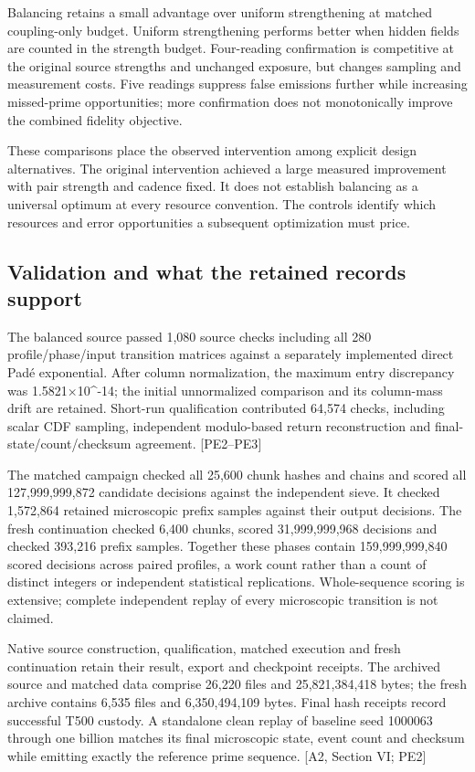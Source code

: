 Balancing retains a small advantage over uniform strengthening at matched coupling-only budget. Uniform strengthening performs better when hidden fields are counted in the strength budget. Four-reading confirmation is competitive at the original source strengths and unchanged exposure, but changes sampling and measurement costs. Five readings suppress false emissions further while increasing missed-prime opportunities; more confirmation does not monotonically improve the combined fidelity objective.

These comparisons place the observed intervention among explicit design alternatives. The original intervention achieved a large measured improvement with pair strength and cadence fixed. It does not establish balancing as a universal optimum at every resource convention. The controls identify which resources and error opportunities a subsequent optimization must price.

\subsection{Validation and what the retained records support}\label{validation-and-what-the-retained-records-support}

The balanced source passed 1,080 source checks including all 280 profile/phase/input transition matrices against a separately implemented direct Padé exponential. After column normalization, the maximum entry discrepancy was 1.5821×10\^{}-14; the initial unnormalized comparison and its column-mass drift are retained. Short-run qualification contributed 64,574 checks, including scalar CDF sampling, independent modulo-based return reconstruction and final-state/count/checksum agreement. {[}PE2--PE3{]}

The matched campaign checked all 25,600 chunk hashes and chains and scored all 127,999,999,872 candidate decisions against the independent sieve. It checked 1,572,864 retained microscopic prefix samples against their output decisions. The fresh continuation checked 6,400 chunks, scored 31,999,999,968 decisions and checked 393,216 prefix samples. Together these phases contain 159,999,999,840 scored decisions across paired profiles, a work count rather than a count of distinct integers or independent statistical replications. Whole-sequence scoring is extensive; complete independent replay of every microscopic transition is not claimed.

Native source construction, qualification, matched execution and fresh continuation retain their result, export and checkpoint receipts. The archived source and matched data comprise 26,220 files and 25,821,384,418 bytes; the fresh archive contains 6,535 files and 6,350,494,109 bytes. Final hash receipts record successful T500 custody. A standalone clean replay of baseline seed 1000063 through one billion matches its final microscopic state, event count and checksum while emitting exactly the reference prime sequence. {[}A2, Section VI; PE2{]}

